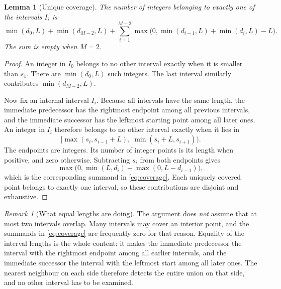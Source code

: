 \documentclass[11pt,letterpaper]{article}
\numberwithin{equation}{section}
\newtheorem{lemma}[theorem]{Lemma}
\theoremstyle{definition}
\theoremstyle{remark}
\newtheorem{remark}[theorem]{Remark}
\begin{document}
\begin{lemma}[Unique coverage]\label{lem:coverage}
The number of integers belonging to exactly one of the intervals $I_i$ is
\begin{equation}\label{eq:coverage}
 \min(d_0,L)+\min(d_{M-2},L)
 +\sum_{i=1}^{M-2}
 \max\!\bigl(0,\min(d_{i-1},L)+\min(d_i,L)-L\bigr).
\end{equation}
The sum is empty when $M=2$.
\end{lemma}
\begin{proof}
An integer in $I_0$ belongs to no other interval exactly when it is smaller
than $s_1$. There are $\min(d_0,L)$ such integers. The last interval similarly
contributes $\min(d_{M-2},L)$.

Now fix an internal interval $I_i$. Because all intervals have the same
length, the immediate predecessor has the rightmost endpoint among all
previous intervals, and the immediate successor has the leftmost starting
point among all later ones. An integer in $I_i$ therefore belongs to no other
interval exactly when it lies in
\[
 [\max(s_i,s_{i-1}+L),\ \min(s_i+L,s_{i+1})).
\]
The endpoints are integers. Its number of integer points is its length when
positive, and zero otherwise. Subtracting $s_i$ from both endpoints gives
\[
 \max\bigl(0,\min(L,d_i)-\max(0,L-d_{i-1})\bigr),
\]
which is the corresponding summand in \eqref{eq:coverage}. Each uniquely
covered point belongs to exactly one interval, so these contributions are
disjoint and exhaustive.
\end{proof}

\begin{remark}[What equal lengths are doing]\label{rem:nooverlapbound}
The argument does \emph{not} assume that at most two intervals overlap.
Many intervals may cover an interior point, and the summands in
\eqref{eq:coverage} are frequently zero for that reason. Equality of the
interval lengths is the whole content: it makes the immediate predecessor
the interval with the rightmost endpoint among all earlier intervals, and
the immediate successor the interval with the leftmost start among all later
ones. The nearest neighbour on each side therefore detects the entire union
on that side, and no other interval has to be examined.
\end{remark}
\end{document}
